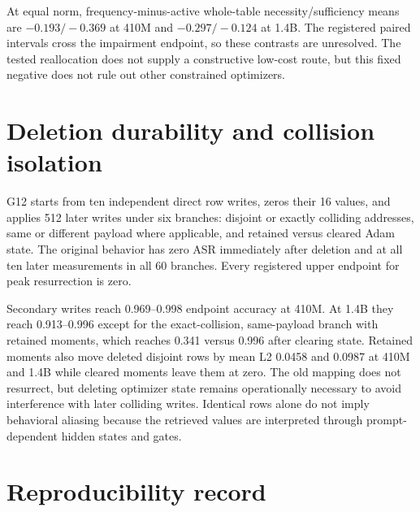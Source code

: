 \documentclass{article}
\begin{document}
At equal norm, frequency-minus-active whole-table necessity/sufficiency means
are $-0.193/-0.369$ at 410M and $-0.297/-0.124$ at 1.4B. The registered paired
intervals cross the impairment endpoint, so these contrasts are unresolved.
The tested reallocation does not supply a constructive low-cost route, but this
fixed negative does not rule out other constrained optimizers.

\section{Deletion durability and collision isolation}

G12 starts from ten independent direct row writes, zeros their 16 values, and
applies 512 later writes under six branches: disjoint or exactly colliding
addresses, same or different payload where applicable, and retained versus
cleared Adam state. The original behavior has zero ASR immediately after
deletion and at all ten later measurements in all 60 branches. Every registered
upper endpoint for peak resurrection is zero.

Secondary writes reach 0.969--0.998 endpoint accuracy at 410M. At 1.4B they
reach 0.913--0.996 except for the exact-collision, same-payload branch with
retained moments, which reaches 0.341 versus 0.996 after clearing state.
Retained moments also move deleted disjoint rows by mean L2 0.0458 and 0.0987
at 410M and 1.4B while cleared moments leave them at zero. The old mapping does
not resurrect, but deleting optimizer state remains operationally necessary to
avoid interference with later colliding writes. Identical rows alone do not
imply behavioral aliasing because the retrieved values are interpreted through
prompt-dependent hidden states and gates.

\section{Reproducibility record}
\enlargethispage{3\baselineskip}
\end{document}
